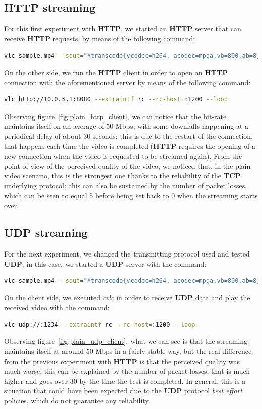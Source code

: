 \documentclass{exam}
\begin{document}
\subsection{HTTP streaming}
For this first experiment with \textbf{HTTP}, we started an \textbf{HTTP} server that can receive \textbf{HTTP} requests, by means of the following command:
\begin{lstlisting}[language=bash]
vlc sample.mp4 --sout="#transcode{vcodec=h264, acodec=mpga,vb=800,ab=8}:std{access=http, mux=ts, http-host=10.0.3.1, port=8080}" --loop
\end{lstlisting}
On the other side, we run the \textbf{HTTP} client in order to open an \textbf{HTTP} connection with the aforementioned server by means of the following command: 
\begin{lstlisting}[language=bash]
vlc http://10.0.3.1:8080 --extraintf rc --rc-host=:1200 --loop
\end{lstlisting}
Observing figure~\ref{fig:plain_http_client}, we can notice that the bit-rate maintains itself on an average of 50 Mbps, with some downfalls happening at a periodical delay of about 30 seconds; this is due to the restart of the connection, that happens each time the video is completed (\textbf{HTTP} requires the opening of a new connection when the video is requested to be streamed again). From the point of view of the perceived quality of the video, we noticed that, in the plain video scenario, this is the strongest one thanks to the reliability of the \textbf{TCP} underlying protocol; this can also be sustained by the number of packet losses, which can be seen to equal 5 before being set back to 0 when the streaming starts over.

\subsection{UDP streaming}
For the next experiment, we changed the transmitting protocol used and tested \textbf{UDP}; in this case, we started a \textbf{UDP} server with the command:
\begin{lstlisting}[language=bash]
vlc sample.mp4 --sout="#transcode{vcodec=h264, acodec=mpga,vb=800,ab=8}:std{access=udp, mux=ts, dst=10.0.3.2, port=1234}" --loop
\end{lstlisting}
On the client side, we executed \textit{cvlc} in order to receive \textbf{UDP} data and play the received video with the command:
\begin{lstlisting}[language=bash]
vlc udp://:1234 --extraintf rc --rc-host=:1200 --loop
\end{lstlisting}
Observing figure~\ref{fig:plain_udp_client}, what we can see is that the streaming maintains itself at around 50 Mbps in a fairly stable way, but the real difference from the previous experiment with \textbf{HTTP} is that the perceived quality was much worse; this can be explained by the number of packet losses, that is much higher and goes over 30 by the time the test is completed. In general, this is a situation that could have been expected due to the \textbf{UDP} protocol \textit{best effort} policies, which do not guarantee any reliability.
\end{document}
